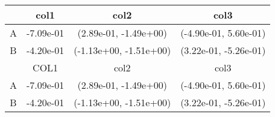 \begin{tabular}{cccc}
\toprule
&col1&col2&col3\tabularnewline
\midrule
A&-7.09e-01& (2.89e-01, -1.49e+00)& (-4.90e-01, 5.60e-01)\tabularnewline
B&-4.20e-01& (-1.13e+00, -1.51e+00)& (3.22e-01, -5.26e-01)\tabularnewline
\midrule
&COL1&col2&col3\tabularnewline
\midrule
A&-7.09e-01& (2.89e-01, -1.49e+00)& (-4.90e-01, 5.60e-01)\tabularnewline
B&-4.20e-01& (-1.13e+00, -1.51e+00)& (3.22e-01, -5.26e-01)\tabularnewline
\bottomrule
\end{tabular}
